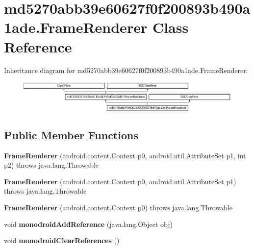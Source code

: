 \hypertarget{classmd5270abb39e60627f0f200893b490a1ade_1_1FrameRenderer}{}\section{md5270abb39e60627f0f200893b490a1ade.\+Frame\+Renderer Class Reference}
\label{classmd5270abb39e60627f0f200893b490a1ade_1_1FrameRenderer}
Inheritance diagram for md5270abb39e60627f0f200893b490a1ade.\+Frame\+Renderer\+:\begin{figure}[H]
\begin{center}
\leavevmode
\includegraphics[height=1.581921cm]{classmd5270abb39e60627f0f200893b490a1ade_1_1FrameRenderer}
\end{center}
\end{figure}
\subsection*{Public Member Functions}
\begin{DoxyCompactItemize}
\item 
\mbox{\label{classmd5270abb39e60627f0f200893b490a1ade_1_1FrameRenderer_a543d9dca2ecf03f07b3939703cdb19eb}} 
{\bfseries Frame\+Renderer} (android.\+content.\+Context p0, android.\+util.\+Attribute\+Set p1, int p2)  throws java.\+lang.\+Throwable 	
\item 
\mbox{\label{classmd5270abb39e60627f0f200893b490a1ade_1_1FrameRenderer_aea6c9c6c24382a82ce1dec0437826cbc}} 
{\bfseries Frame\+Renderer} (android.\+content.\+Context p0, android.\+util.\+Attribute\+Set p1)  throws java.\+lang.\+Throwable 	
\item 
\mbox{\label{classmd5270abb39e60627f0f200893b490a1ade_1_1FrameRenderer_acee389c5c7dfa4207930e0f43ce1349f}} 
{\bfseries Frame\+Renderer} (android.\+content.\+Context p0)  throws java.\+lang.\+Throwable 	
\item 
\mbox{\label{classmd5270abb39e60627f0f200893b490a1ade_1_1FrameRenderer_afab5536e45566fe5a5bb5bd22faef608}} 
void {\bfseries monodroid\+Add\+Reference} (java.\+lang.\+Object obj)
\item 
\mbox{\label{classmd5270abb39e60627f0f200893b490a1ade_1_1FrameRenderer_ad655b8c79cca686e12df7655fe93f7f7}} 
void {\bfseries monodroid\+Clear\+References} ()
\end{DoxyCompactItemize}
